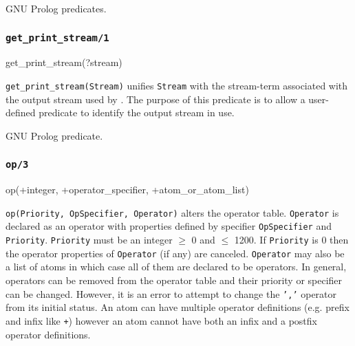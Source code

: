 GNU Prolog predicates.

\subsubsection{\texttt{get\_print\_stream/1}}

\begin{TemplatesOneCol}
get\_print\_stream(?stream)

\end{TemplatesOneCol}

\Description

\texttt{get\_print\_stream(Stream)} unifies \texttt{Stream} with the
stream-term associated with the output stream used by 
. The purpose of this predicate is to allow a
user-defined  predicate to identify the output stream in
use.

\begin{PlErrors}


\end{PlErrors}

\Portability

GNU Prolog predicate.

\subsubsection{\texttt{op/3}}
\label{op/3:(Term-input/output)}

\begin{TemplatesOneCol}
op(+integer, +operator\_specifier, +atom\_or\_atom\_list)

\end{TemplatesOneCol}

\Description

\texttt{op(Priority, OpSpecifier, Operator)} alters the operator table.
\texttt{Operator} is declared as an operator with properties defined by
specifier \texttt{OpSpecifier} and \texttt{Priority}. \texttt{Priority} must
be an integer $\geq$ 0 and $\leq$ 1200. If \texttt{Priority} is 0 then the
operator properties of \texttt{Operator} (if any) are canceled.
\texttt{Operator} may also be a list of atoms in which case all of them are
declared to be operators. In general, operators can be removed from
the operator table and their priority or specifier can be changed. However,
it is an error to attempt to change the \texttt{','} operator from its
initial status. An atom can have multiple operator definitions (e.g.
prefix and infix like \texttt{+}) however an atom cannot have both an
infix and a postfix operator definitions.

